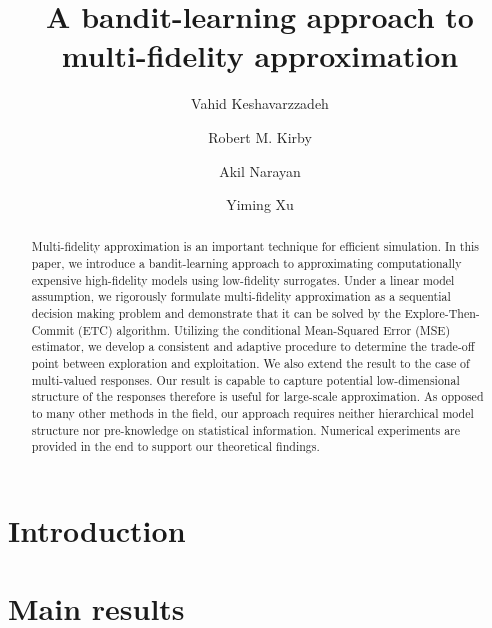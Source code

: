 \documentclass[a4paper,11pt]{article}
\numberwithin{equation}{section}
\theoremstyle{plain}
\theoremstyle{definition}
\begin{document}
\date{}

\title{A bandit-learning approach to multi-fidelity approximation}
\author[3]{\small Vahid Keshavarzzadeh}
\author[2,3]{ Robert M. Kirby}
\author[1,3]{Akil Narayan}
\author[1]{Yiming Xu}
\renewcommand\Authands{ and }
  
\maketitle


\begin{abstract}
Multi-fidelity approximation is an important technique for efficient simulation. 
In this paper, we introduce a bandit-learning approach to approximating computationally expensive high-fidelity models using low-fidelity surrogates. 
Under a linear model assumption, we rigorously formulate multi-fidelity approximation as a sequential decision making problem and demonstrate that it can be solved by the Explore-Then-Commit (ETC) algorithm. 
Utilizing the conditional Mean-Squared Error (MSE) estimator, we develop a consistent and adaptive procedure to determine the trade-off point between exploration and exploitation. 
We also extend the result to the case of multi-valued responses.
Our result is capable to capture potential low-dimensional structure of the responses therefore is useful for large-scale approximation.
As opposed to many other methods in the field, our approach requires neither hierarchical model structure nor pre-knowledge on statistical information.  
Numerical experiments are provided in the end to support our theoretical findings.
\end{abstract}



\section{Introduction}


\section{Main results}
\end{document}
